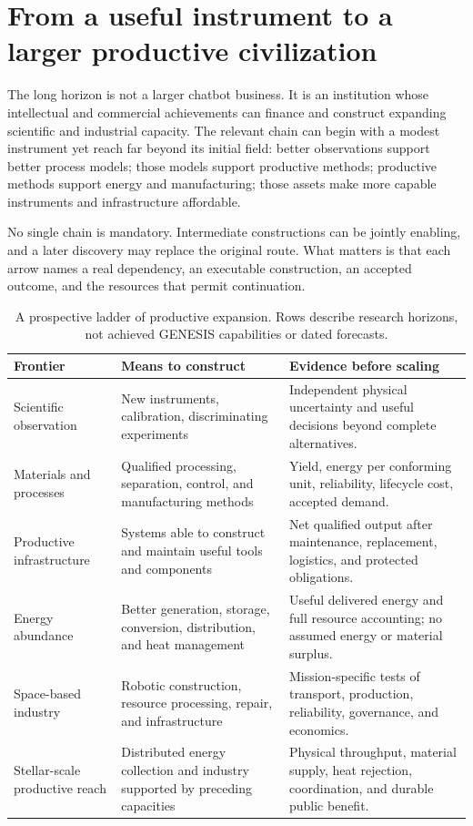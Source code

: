 \documentclass[11pt,letterpaper]{article}
\theoremstyle{remark}\newtheorem{remark}{Remark}[section]
\begin{document}
\section{From a useful instrument to a larger productive civilization}
\label{sec:horizon}
The long horizon is not a larger chatbot business. It is an institution whose intellectual and commercial achievements can finance and construct expanding scientific and industrial capacity. The relevant chain can begin with a modest instrument yet reach far beyond its initial field: better observations support better process models; those models support productive methods; productive methods support energy and manufacturing; those assets make more capable instruments and infrastructure affordable.

No single chain is mandatory. Intermediate constructions can be jointly enabling, and a later discovery may replace the original route. What matters is that each arrow names a real dependency, an executable construction, an accepted outcome, and the resources that permit continuation.

\begin{table}[htbp]
\caption{A prospective ladder of productive expansion. Rows describe research horizons, not achieved GENESIS capabilities or dated forecasts.}
\label{tab:ladder}
\begin{tabularx}{\linewidth}{P{2.8cm}YY}
\toprule
\textbf{Frontier}&\textbf{Means to construct}&\textbf{Evidence before scaling}\\\midrule
Scientific observation&New instruments, calibration, discriminating experiments&Independent physical uncertainty and useful decisions beyond complete alternatives.\\
Materials and processes&Qualified processing, separation, control, and manufacturing methods&Yield, energy per conforming unit, reliability, lifecycle cost, accepted demand.\\
Productive infrastructure&Systems able to construct and maintain useful tools and components&Net qualified output after maintenance, replacement, logistics, and protected obligations.\\
Energy abundance&Better generation, storage, conversion, distribution, and heat management&Useful delivered energy and full resource accounting; no assumed energy or material surplus.\\
Space-based industry&Robotic construction, resource processing, repair, and infrastructure&Mission-specific tests of transport, production, reliability, governance, and economics.\\
Stellar-scale productive reach&Distributed energy collection and industry supported by preceding capacities&Physical throughput, material supply, heat rejection, coordination, and durable public benefit.\\\bottomrule
\end{tabularx}
\end{table}
\end{document}
